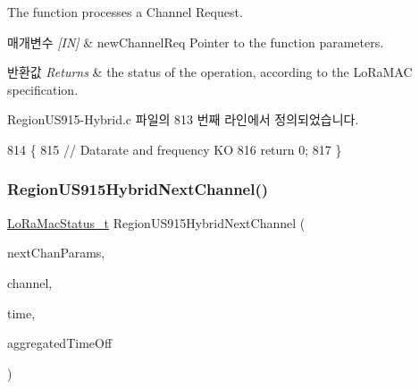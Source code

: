 The function processes a Channel Request. 


\begin{DoxyParams}{매개변수}
{\em \mbox{[}\+I\+N\mbox{]}} & new\+Channel\+Req Pointer to the function parameters.\\
\hline
\end{DoxyParams}

\begin{DoxyRetVals}{반환값}
{\em Returns} & the status of the operation, according to the Lo\+Ra\+M\+AC specification. \\
\hline
\end{DoxyRetVals}


Region\+U\+S915-\/\+Hybrid.\+c 파일의 813 번째 라인에서 정의되었습니다.


\begin{DoxyCode}
814 \{
815     \textcolor{comment}{// Datarate and frequency KO}
816     \textcolor{keywordflow}{return} 0;
817 \}
\end{DoxyCode}
\mbox{\label{group___r_e_g_i_o_n_u_s915_h_y_b_gae74c05f827a9ed78b0ec0cacdec45f28}} 
\subsubsection{\texorpdfstring{Region\+U\+S915\+Hybrid\+Next\+Channel()}{RegionUS915HybridNextChannel()}}
{\footnotesize\ttfamily \mbox{\hyperlink{group___l_o_r_a_m_a_c_ga30bd25657e10480f8605ee951b0ecfbd}{Lo\+Ra\+Mac\+Status\+\_\+t}} Region\+U\+S915\+Hybrid\+Next\+Channel (\begin{DoxyParamCaption}\item[{\mbox{\hyperlink{group___r_e_g_i_o_n_ga115f5e83afae352c0a3dcdc193374040}{Next\+Chan\+Params\+\_\+t}} $\ast$}]{next\+Chan\+Params,  }\item[{uint8\+\_\+t $\ast$}]{channel,  }\item[{\mbox{\hyperlink{utilities_8h_a4215ca43d3e953099ea758ce428599d0}{Timer\+Time\+\_\+t}} $\ast$}]{time,  }\item[{\mbox{\hyperlink{utilities_8h_a4215ca43d3e953099ea758ce428599d0}{Timer\+Time\+\_\+t}} $\ast$}]{aggregated\+Time\+Off }\end{DoxyParamCaption})}



